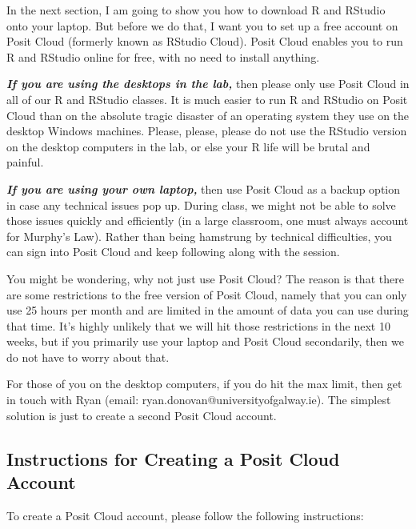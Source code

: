 \documentclass[
]{book}
\begin{document}
In the next section, I am going to show you how to download R and RStudio onto your laptop. But before we do that, I want you to set up a free account on Posit Cloud (formerly known as RStudio Cloud). Posit Cloud enables you to run R and RStudio online for free, with no need to install anything.

\textbf{\emph{If you are using the desktops in the lab,}} then please only use Posit Cloud in all of our R and RStudio classes. It is much easier to run R and RStudio on Posit Cloud than on the absolute tragic disaster of an operating system they use on the desktop Windows machines. Please, please, please do not use the RStudio version on the desktop computers in the lab, or else your R life will be brutal and painful.

\textbf{\emph{If you are using your own laptop,}} then use Posit Cloud as a backup option in case any technical issues pop up. During class, we might not be able to solve those issues quickly and efficiently (in a large classroom, one must always account for Murphy's Law). Rather than being hamstrung by technical difficulties, you can sign into Posit Cloud and keep following along with the session.

You might be wondering, why not just use Posit Cloud? The reason is that there are some restrictions to the free version of Posit Cloud, namely that you can only use 25 hours per month and are limited in the amount of data you can use during that time. It's highly unlikely that we will hit those restrictions in the next 10 weeks, but if you primarily use your laptop and Posit Cloud secondarily, then we do not have to worry about that.

For those of you on the desktop computers, if you do hit the max limit, then get in touch with Ryan (email: ryan.donovan@universityofgalway.ie). The simplest solution is just to create a second Posit Cloud account.

\subsection{Instructions for Creating a Posit Cloud Account}\label{instructions-for-creating-a-posit-cloud-account}

To create a Posit Cloud account, please follow the following instructions:
\end{document}
